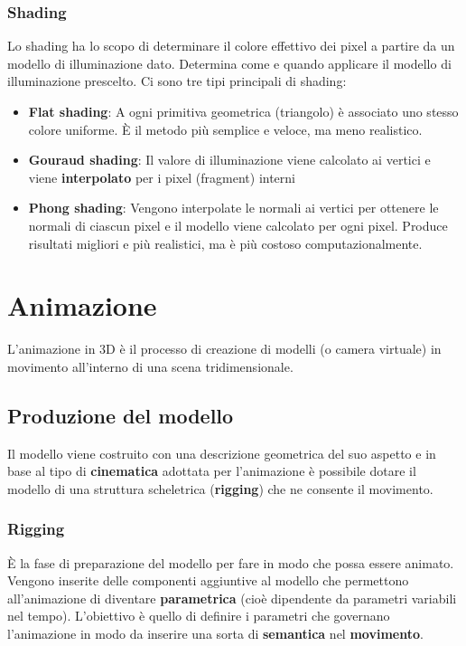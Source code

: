 \documentclass[a4paper]{article}
\begin{document}
\subsubsection{Shading}
Lo shading ha lo scopo di determinare il colore effettivo dei pixel a partire da un modello
di illuminazione dato. Determina come e quando applicare il modello di illuminazione prescelto.
Ci sono tre tipi principali di shading:
\begin{itemize}
  \item \textbf{Flat shading}: A ogni primitiva geometrica (triangolo) è associato uno
    stesso colore uniforme. È il metodo più semplice e veloce, ma meno realistico.
  \item \textbf{Gouraud shading}: Il valore di illuminazione viene calcolato ai vertici
    e viene \textbf{interpolato} per i pixel (fragment) interni
  \item \textbf{Phong shading}: Vengono interpolate le normali ai vertici per ottenere le
    normali di ciascun pixel e il modello viene calcolato per ogni pixel. Produce risultati
    migliori e più realistici, ma è più costoso computazionalmente.
\end{itemize}

\section{Animazione}
L'animazione in 3D è il processo di creazione di modelli (o camera virtuale)
in movimento all'interno di una scena tridimensionale.

\subsection{Produzione del modello}
Il modello viene costruito con una descrizione geometrica del suo aspetto e in base
al tipo di \textbf{cinematica} adottata per l'animazione è possibile dotare il
modello di una struttura scheletrica (\textbf{rigging}) che ne consente il movimento.

\subsubsection{Rigging}
È la fase di preparazione del modello per fare in modo che possa essere animato. Vengono
inserite delle componenti aggiuntive al modello che permettono all'animazione di
diventare \textbf{parametrica} (cioè dipendente da parametri variabili nel tempo).
L'obiettivo è quello di definire i parametri che governano l'animazione in modo da
inserire una sorta di \textbf{semantica} nel \textbf{movimento}.
\end{document}
